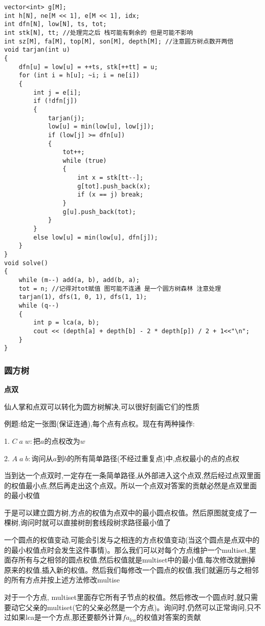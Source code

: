 \documentclass[a4paper, fontset=none]{ctexart}
\begin{document}
\begin{verbatim}
vector<int> g[M];
int h[N], ne[M << 1], e[M << 1], idx;
int dfn[N], low[N], ts, tot;
int stk[N], tt; //处理完之后 栈可能有剩余的 但是可能不影响
int sz[M], fa[M], top[M], son[M], depth[M]; //注意圆方树点数开两倍
void tarjan(int u)
{
    dfn[u] = low[u] = ++ts, stk[++tt] = u;
    for (int i = h[u]; ~i; i = ne[i])
    {
        int j = e[i];
        if (!dfn[j])
        {
            tarjan(j);
            low[u] = min(low[u], low[j]);
            if (low[j] >= dfn[u])
            {
                tot++;
                while (true)
                {
                    int x = stk[tt--];
                    g[tot].push_back(x);
                    if (x == j) break;
                }
                g[u].push_back(tot);
            }
        }
        else low[u] = min(low[u], dfn[j]);
    }
}
void solve()
{
    while (m--) add(a, b), add(b, a);
    tot = n; //记得对tot赋值 图可能不连通 是一个圆方树森林 注意处理
    tarjan(1), dfs(1, 0, 1), dfs(1, 1);
    while (q--)
    {
        int p = lca(a, b);
        cout << (depth[a] + depth[b] - 2 * depth[p]) / 2 + 1<<"\n";
    }
}
\end{verbatim}
\subsubsection{圆方树}

\textbf{点双}

仙人掌和点双可以转化为圆方树解决,可以很好刻画它们的性质

例题:给定一张图(保证连通),每个点有点权。现在有两种操作:

1. $C\;a\;w:$把$a$的点权改为$w$

2. $A\;a\;b:$询问从$a$到$b$的所有简单路径(不经过重复点)中,点权最小的点的点权

当到达一个点双时,一定存在一条简单路径,从外部进入这个点双,然后经过点双里面的权值最小点,然后再走出这个点双。所以一个点双对答案的贡献必然是点双里面的最小权值

于是可以建立圆方树,方点的权值为点双中的最小圆点权值。然后原图就变成了一棵树,询问时就可以直接树剖套线段树求路径最小值了

一个圆点的权值变动,可能会引发与之相连的方点权值变动(当这个圆点是点双中的的最小权值点时会发生这件事情)。那么我们可以对每个方点维护一个multiset,里面存所有与之相邻的圆点权值,然后权值就是multiset中的最小值,每次修改就删掉原来的权值,插入新的权值。然后我们每修改一个圆点的权值,我们就遍历与之相邻的所有方点并按上述方法修改multise

对于一个方点, multiset里面存它所有子节点的权值。然后修改一个圆点时,就只需要动它父亲的multiset(它的父亲必然是一个方点)。询问时,仍然可以正常询问,只不过如果lca是一个方点,那还要额外计算$fa_{lca}$的权值对答案的贡献
\end{document}
